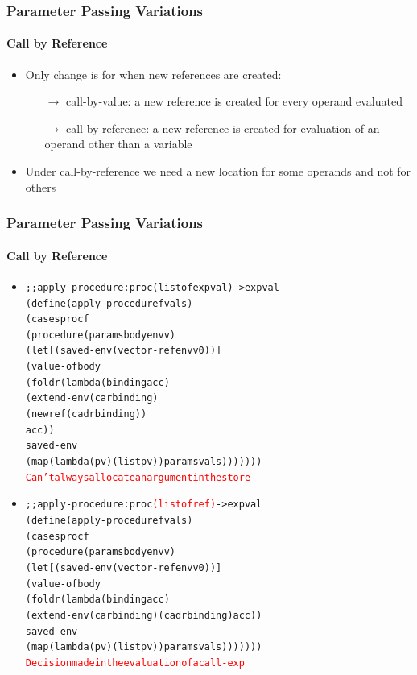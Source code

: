 \documentclass{beamer}
\newcommand{\arrow}{\(\rightarrow\)}
\begin{document}
\begin{frame}[fragile]
\frametitle{Parameter Passing Variations}
\framesubtitle{Call by Reference}
\begin{scriptsize}
\begin{itemize}
\item<1-> Only change is for when new references are created:
\begin{itemize}
 \item[\arrow] call-by-value: a new reference is created for every operand evaluated

 \item[\arrow] call-by-reference: a new reference is created for evaluation of an operand other than a variable
\end{itemize}

\item Under call-by-reference we need a new location for some operands and not for others

\end{itemize}
\end{scriptsize}
\end{frame}

\begin{frame}[fragile]
\frametitle{Parameter Passing Variations}
\framesubtitle{Call by Reference}
\begin{scriptsize}
\begin{itemize}
\item<1->
\begin{alltt}
;; apply-procedure : proc (listof expval) -> expval
(define (apply-procedure f vals)
  (cases proc f
    (procedure (params body envv)
      (let [(saved-env (vector-ref envv 0))]
        (value-of body
          (foldr (lambda (binding acc)
                   (extend-env (car binding)
                               (newref (cadr binding))
                               acc))
                 saved-env
                 (map (lambda (p v) (list p v)) params vals)))))))
\textcolor{red}{Can't always allocate an argument in the store}
\end{alltt}

\item<2->
\begin{alltt}
;; apply-procedure : proc \textcolor{red}{(listof ref)} -> expval
(define (apply-procedure f vals)
 (cases proc f
  (procedure (params body envv)
   (let [(saved-env (vector-ref envv 0))]
    (value-of body
             (foldr (lambda (binding acc)
                     (extend-env (car binding) (cadr binding) acc))
                     saved-env
                     (map (lambda (p v) (list p v)) params vals)))))))
\textcolor{red}{Decision made in the evaluation of a call-exp}
\end{alltt}

\end{itemize}
\end{scriptsize}
\end{frame}
\end{document}
